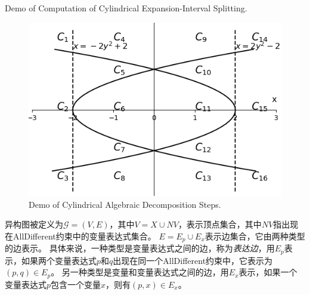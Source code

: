 \begin{example}

\end{example}

\begin{table}[]
    \centering
         {Demo of Computation of Cylindrical Expansion-Interval Splitting.}
\label{tab:expansion}
\end{table}

\begin{figure}[t]
    \centering
    \includegraphics[width=\columnwidth]{Img/cad.png}
     {Demo of Cylindrical Algebraic Decomposition Steps.}
\label{fig:CAD}
\end{figure}


\begin{definition}
    异构图被定义为$\mathcal{G} = (V, E)$，其中$V = X\cup NV$，表示顶点集合，其中$NV$指出现在AllDifferent约束中的变量表达式集合。
    $E = E_p \cup E_x$表示边集合，它由两种类型的边表示。
    具体来说，一种类型是变量表达式之间的边，称为\textit{表达边}，用$E_p$表示，如果两个变量表达式$p$和$q$出现在同一个AllDifferent约束中，它表示为$(p, q) \in E_p$。
    另一种类型是变量和变量表达式之间的边，用$E_x$表示，如果一个变量表达式$p$包含一个变量$x$，则有$(p, x) \in E_x$。
\end{definition}

